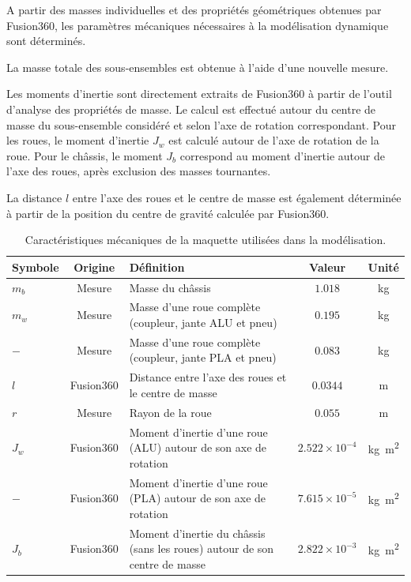 A partir des masses individuelles et des propriétés géométriques obtenues par Fusion360, les paramètres mécaniques nécessaires à la modélisation dynamique sont déterminés.

La masse totale des sous-ensembles est obtenue à l'aide d'une nouvelle mesure.

Les moments d'inertie sont directement extraits de Fusion360 à partir de l'outil d'analyse des propriétés de masse. Le calcul est effectué autour du centre de masse du sous-ensemble considéré et selon l'axe de rotation correspondant. Pour les roues, le moment d'inertie $J_w$ est calculé autour de l'axe de rotation de la roue. Pour le châssis, le moment $J_b$ correspond au moment d'inertie autour de l'axe des roues, après exclusion des masses tournantes.

La distance $l$ entre l'axe des roues et le centre de masse est également déterminée à partir de la position du centre de gravité calculée par Fusion360.
\begin{table}[H]
\centering
\begin{tabular}{|l|c|p{5.2cm}|c|c|}
\hline
\textbf{Symbole} & \textbf{Origine} & \textbf{Définition} & \textbf{Valeur} & \textbf{Unité} \\
\hline
$m_b$ & Mesure & Masse du châssis & $1.018$ & \si{\kilogram} \\
\hline
$m_w$ & Mesure & Masse d'une roue complète (coupleur, jante ALU et pneu) & $0.195$ & \si{\kilogram} \\
\hline
$-$ & Mesure & Masse d'une roue complète (coupleur, jante PLA et pneu) & $0.083$ & \si{\kilogram} \\
\hline
$l$ & Fusion360 & Distance entre l'axe des roues et le centre de masse & $0.0344$ & \si{\metre} \\
\hline
$r$ & Mesure & Rayon de la roue & $0.055$ & \si{\metre} \\
\hline
$J_w$ & Fusion360 & Moment d'inertie d'une roue (ALU) autour de son axe de rotation & $2.522\times10^{-4}$ & \si{\kilogram\metre\squared} \\
\hline
$-$ & Fusion360 & Moment d'inertie d'une roue (PLA) autour de son axe de rotation & $7.615\times10^{-5}$ & \si{\kilogram\metre\squared} \\
\hline
$J_b$ & Fusion360 & Moment d'inertie du châssis (sans les roues) autour de son centre de masse & $2.822\times10^{-3}$ & \si{\kilogram\metre\squared} \\
\hline
\end{tabular}
\caption{Caractéristiques mécaniques de la maquette utilisées dans la modélisation.}
\label{tab:caracteristiques_mecaniques}
\end{table}

